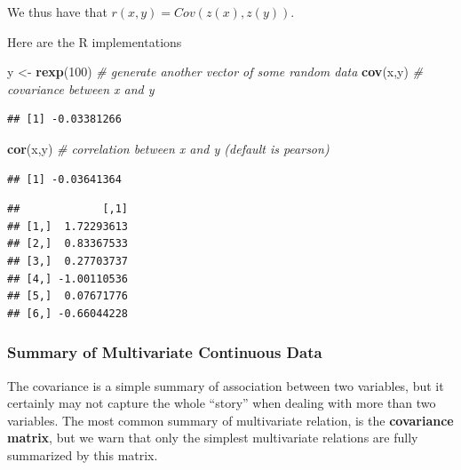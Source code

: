 \documentclass[]{book}
\newenvironment{Shaded}{\begin{snugshade}}{\end{snugshade}}
\newcommand{\CommentTok}[1]{\textcolor[rgb]{0.56,0.35,0.01}{\textit{#1}}}
\newcommand{\DecValTok}[1]{\textcolor[rgb]{0.00,0.00,0.81}{#1}}
\newcommand{\KeywordTok}[1]{\textcolor[rgb]{0.13,0.29,0.53}{\textbf{#1}}}
\newcommand{\NormalTok}[1]{#1}
\newcommand{\OperatorTok}[1]{\textcolor[rgb]{0.81,0.36,0.00}{\textbf{#1}}}
\newcommand{\StringTok}[1]{\textcolor[rgb]{0.31,0.60,0.02}{#1}}
\theoremstyle{definition}
\theoremstyle{definition}
\theoremstyle{definition}
\theoremstyle{remark}
\begin{document}
We thus have that \(r(x,y)=Cov(z(x),z(y))\).

Here are the R implementations

\begin{Shaded}
\begin{Highlighting}[]
\NormalTok{y <-}\StringTok{ }\KeywordTok{rexp}\NormalTok{(}\DecValTok{100}\NormalTok{) }\CommentTok{# generate another vector of some random data}
\KeywordTok{cov}\NormalTok{(x,y) }\CommentTok{# covariance between x and y}
\end{Highlighting}
\end{Shaded}

\begin{verbatim}
## [1] -0.03381266
\end{verbatim}

\begin{Shaded}
\begin{Highlighting}[]
\KeywordTok{cor}\NormalTok{(x,y) }\CommentTok{# correlation between x and y (default is pearson)}
\end{Highlighting}
\end{Shaded}

\begin{verbatim}
## [1] -0.03641364
\end{verbatim}

\begin{Shaded}
\end{Shaded}

\begin{verbatim}
##             [,1]
## [1,]  1.72293613
## [2,]  0.83367533
## [3,]  0.27703737
## [4,] -1.00110536
## [5,]  0.07671776
## [6,] -0.66044228
\end{verbatim}

\hypertarget{summary-of-multivariate-continuous-data}{%
\subsubsection{Summary of Multivariate Continuous Data}\label{summary-of-multivariate-continuous-data}}

The covariance is a simple summary of association between two variables, but it certainly may not capture the whole ``story'' when dealing with more than two variables.
The most common summary of multivariate relation, is the \textbf{covariance matrix}, but we warn that only the simplest multivariate relations are fully summarized by this matrix.
\end{document}
